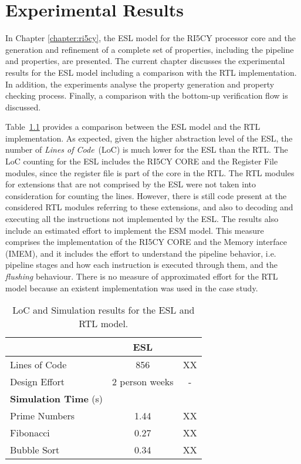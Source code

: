 \chapter{Experimental Results}
\label{chapter:results}

In Chapter \ref{chapter:ri5cy}, the ESL model for the RI5CY processor core and the generation and refinement of a complete set of properties, including the pipeline and \SSQED{} properties, are presented. The current chapter discusses the experimental results for the ESL model including a comparison with the RTL implementation. In addition, the experiments analyse the property generation and property checking process. Finally, a comparison with the bottom-up verification flow is discussed.

Table~\ref{tab:esl-rtl-comp} provides a comparison between the ESL model and the RTL implementation. As expected, given the higher abstraction level of the ESL, the number of \textit{Lines of Code}~(LoC) is much lower for the ESL than the RTL. The LoC counting for the ESL includes the RI5CY CORE and the Register File modules, since the register file is part of the core in the RTL. The RTL modules for extensions that are not comprised by the ESL were not taken into consideration for counting the lines. However, there is still code present at the considered RTL modules referring to these extensions, and also to decoding and executing all the instructions not implemented by the ESL. The results also include an estimated effort to implement the ESM model. This measure comprises the implementation of the RI5CY CORE and the Memory interface (IMEM), and it includes the effort to understand the pipeline behavior, i.e. pipeline stages and how each instruction is executed through them, and the \textit{flushing} behaviour. There is no measure of approximated effort for the RTL model because an existent implementation was used in the case study.  

\begin{table}[htb!] 
	\centering 
	\caption{LoC and Simulation results for the ESL and RTL model.} 
	\label{tab:esl-rtl-comp}
	\begin{tabular}{p{5cm} c c} 
		  &  \textbf{ESL} & \textbf{\SSSAY{RTL}} \\     
		\hline	
		Lines of Code  & 856 & XX \\
		Design Effort & 2 person weeks & - \\
		\hline
		\textbf{Simulation Time} (s) & & \\
		\hline
		Prime Numbers  &  1.44 & XX \\
		Fibonacci  &  0.27 & XX \\
		Bubble Sort  &  0.34 & XX \\
	\end{tabular} 
\end{table}

